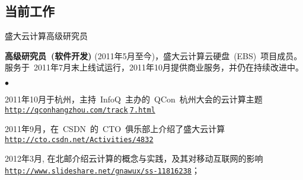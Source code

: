 \documentclass[margin,line]{res}
\newenvironment{list1}{
  \begin{list}{\ding{113}}{%
      \setlength{\itemsep}{0in}
      \setlength{\parsep}{0in} \setlength{\parskip}{0in}
      \setlength{\topsep}{0in} \setlength{\partopsep}{0in} 
      \setlength{\leftmargin}{0.17in}}}{\end{list}}
\newenvironment{list2}{
  \begin{list}{$\bullet$}{%
      \setlength{\itemsep}{0in}
      \setlength{\parsep}{0in} \setlength{\parskip}{0in}
      \setlength{\topsep}{0in} \setlength{\partopsep}{0in} 
      \setlength{\leftmargin}{0.2in}}}{\end{list}}
\newcommand{\http}{http:/\hspace{-0.3ex}/}
\newcommand{\hindent}{\mbox{\hspace{8ex}}}
\begin{document}
\begin{resume}
\section{当前工作}
\textsf{盛大云计算高级研究员}\\
\vspace*{-.1in}
\begin{list1}
\item[] \textbf{高级研究员~(软件开发)}\/ (2011年5月至今)，盛大云计算云硬盘~(EBS)~项目成员。服务于~2011年7月末上线试运行，2011年10月提供商业服务，并仍在持续改进中。
\begin{list2}
\vspace*{.05in}
\item 2011年10月于杭州，主持~InfoQ~主办的~QCon~杭州大会的云计算主题~\\ \hindent\href{http://qconhangzhou.com/track_7.html}{\tt\http{}qconhangzhou.com/track$\underline{}$7.html}
\item 2011年9月，在~CSDN~的~CTO~俱乐部上介绍了盛大云计算~\\ \hindent\href{http://cto.csdn.net/Activities/4832}{\tt\http{}cto.csdn.net/Activities/4832}
\item 2012年3月, 在北邮介绍云计算的概念与实践，及其对移动互联网的影响 \\ \hindent\href{http://www.slideshare.net/gnawux/ss-11816238}{\tt\http{}www.slideshare.net/gnawux/ss-11816238}；
\end{list2}
\end{list1}



\end{resume}
\end{document}
